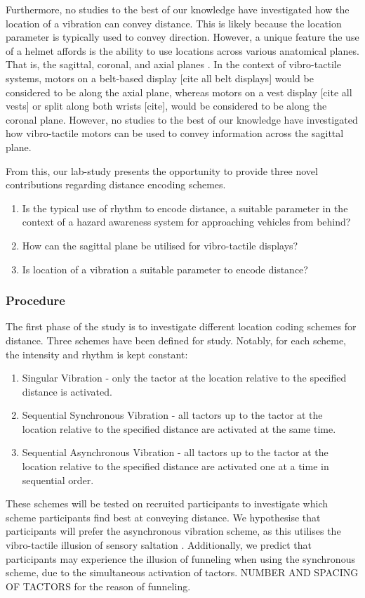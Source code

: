 \documentclass{interim}
\begin{document}
Furthermore, no studies to the best of our knowledge have investigated how the location of a vibration can convey distance. This is likely because the location parameter is typically used to convey direction. However, a unique feature the use of a helmet affords is the ability to use locations across various anatomical planes. That is, the sagittal, coronal, and axial planes \cite{anatomical}. In the context of vibro-tactile systems, motors on a belt-based display [cite all belt displays] would be considered to be along the axial plane, whereas motors on a vest display [cite all vests] or split along both wrists [cite], would be considered to be along the coronal plane. However, no studies to the best of our knowledge have investigated how vibro-tactile motors can be used to convey information across the sagittal plane.

From this, our lab-study presents the opportunity to provide three novel contributions regarding distance encoding schemes.
\begin{enumerate}
    \item Is the typical use of rhythm to encode distance, a suitable parameter in the context of a hazard awareness system for approaching vehicles from behind?
    \item How can the sagittal plane be utilised for vibro-tactile displays?
    \item Is location of a vibration a suitable parameter to encode distance?
\end{enumerate}


\subsubsection{Procedure}\label{sec:lab-procedure}
The first phase of the study is to investigate different location coding schemes for distance. Three schemes have been defined for study. Notably, for each scheme, the intensity and rhythm is kept constant:
\begin{enumerate}
    \item Singular Vibration - only the tactor at the location relative to the specified distance is activated.
    \item Sequential Synchronous Vibration - all tactors up to the tactor at the location relative to the specified distance are activated at the same time.
    \item Sequential Asynchronous Vibration - all tactors up to the tactor at the location relative to the specified distance are activated one at a time in sequential order.
\end{enumerate}
These schemes will be tested on recruited participants to investigate which scheme participants find best at conveying distance. We hypothesise that participants will prefer the asynchronous vibration scheme, as this utilises the vibro-tactile illusion of sensory saltation \cite{5710913}. Additionally, we predict that participants may experience the illusion of funneling when using the synchronous scheme, due to the simultaneous activation of tactors. NUMBER AND SPACING OF TACTORS for the reason of funneling.
\end{document}
